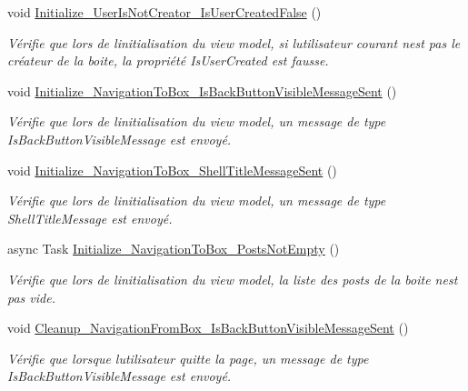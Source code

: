 \begin{DoxyCompactItemize}
void \hyperlink{class_boxes_1_1_tests_1_1_box_view_model_tests_a639f3263666d93117b3bdb4471eae602}{Initialize\+\_\+\+User\+Is\+Not\+Creator\+\_\+\+Is\+User\+Created\+False} ()
\begin{DoxyCompactList}\small\item\em Vérifie que lors de l\textquotesingle{}initialisation du view model, si l\textquotesingle{}utilisateur courant n\textquotesingle{}est pas le créateur de la boite, la propriété {\ttfamily Is\+User\+Created} est fausse. \end{DoxyCompactList}\item 
void \hyperlink{class_boxes_1_1_tests_1_1_box_view_model_tests_a5a09aa20411d522fe7d7b6ea18bd8163}{Initialize\+\_\+\+Navigation\+To\+Box\+\_\+\+Is\+Back\+Button\+Visible\+Message\+Sent} ()
\begin{DoxyCompactList}\small\item\em Vérifie que lors de l\textquotesingle{}initialisation du view model, un message de type Is\+Back\+Button\+Visible\+Message est envoyé. \end{DoxyCompactList}\item 
void \hyperlink{class_boxes_1_1_tests_1_1_box_view_model_tests_a93ebcdce7b66d31a8d362c80342904da}{Initialize\+\_\+\+Navigation\+To\+Box\+\_\+\+Shell\+Title\+Message\+Sent} ()
\begin{DoxyCompactList}\small\item\em Vérifie que lors de l\textquotesingle{}initialisation du view model, un message de type Shell\+Title\+Message est envoyé. \end{DoxyCompactList}\item 
async Task \hyperlink{class_boxes_1_1_tests_1_1_box_view_model_tests_aa6bf6381bc58f74e36e61be08ec4d9f7}{Initialize\+\_\+\+Navigation\+To\+Box\+\_\+\+Posts\+Not\+Empty} ()
\begin{DoxyCompactList}\small\item\em Vérifie que lors de l\textquotesingle{}initialisation du view model, la liste des posts de la boite n\textquotesingle{}est pas vide. \end{DoxyCompactList}\item 
void \hyperlink{class_boxes_1_1_tests_1_1_box_view_model_tests_a509fef9ab5036f8523007bb793262f6d}{Cleanup\+\_\+\+Navigation\+From\+Box\+\_\+\+Is\+Back\+Button\+Visible\+Message\+Sent} ()
\begin{DoxyCompactList}\small\item\em Vérifie que lorsque l\textquotesingle{}utilisateur quitte la page, un message de type Is\+Back\+Button\+Visible\+Message est envoyé. \end{DoxyCompactList}\item 

\end{DoxyCompactItemize}
